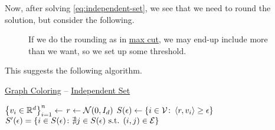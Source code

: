 Now, after solving \autoref{eq:independent-set}, we see that we need to round the solution, but consider the following.

\begin{figure}[H]
	\centering
	\caption{If we do the rounding as in \hyperref[prb:max-cut]{max cut}, we may end-up include more than we want, so we set up some threshold.}
	\label{fig:3-coloring-threshold}
\end{figure}

This suggests the following algorithm.

\begin{algorithm}[H]\label{algo:graph-coloring-independent-set}
	\DontPrintSemicolon
	\caption{\hyperref[prb:graph-coloring]{Graph Coloring} -- \hyperref[def:independent-set]{Independent Set}}
	\BlankLine
	\(\left\{ v_i \in \mathbb{\MakeUppercase{r}} ^d\right\} _{i=1}^n \gets\)\;
	\(r \gets \mathcal{\MakeUppercase{n}} (0, I_d)\)\label{algo:graph-coloring-independent-set-r}
	\(S(\epsilon )\gets\left\{ i\in \mathcal{\MakeUppercase{v}} \colon \left\langle r, v_i \right\rangle \geq \epsilon   \right\} \)
	\(S^\prime (\epsilon )= \left\{ i\in S(\epsilon )\colon \nexists j\in S(\epsilon ) \text{ s.t. } (i, j)\in \mathcal{\MakeUppercase{e}} \right\} \)\;
	\;
\end{algorithm}